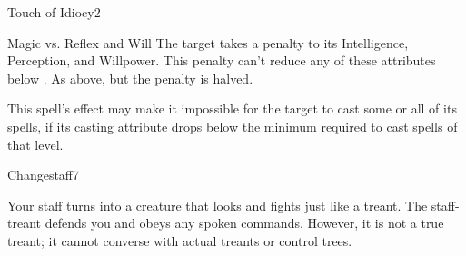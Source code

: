 \begin{spellfooter}
\begin{spellsection}{Touch of Idiocy}{2}
    \begin{spellheader}
    \end{spellheader}
    \begin{spellcontent}
        \begin{spelltargetinginfo}
        \end{spelltargetinginfo}
        \begin{spelleffects}
            \begin{spellattack}{Magic vs. Reflex and Will}
                \spellsuccess[Reflex] The target takes a  penalty to its Intelligence, Perception, and Willpower. This penalty can't reduce any of these attributes below .
                \spellfailure[Will] As above, but the penalty is halved.
            \end{spellattack}
            \spelldur \durshort
        \end{spelleffects}
    \end{spellcontent}
    \begin{spellfooter}
        \spellnotes This spell's effect may make it impossible for the target to cast some or all of its spells, if its casting attribute drops below the minimum required to cast spells of that level.
    \end{spellfooter}
\end{spellsection}

\begin{spellsection}{Changestaff}{7}
    \begin{spellheader}
    \end{spellheader}
    \begin{spellcontent}
        \begin{spelltargetinginfo}
        \end{spelltargetinginfo}
        \begin{spelleffects}
            \spelleffect Your staff turns into a creature that looks and fights just like a treant. The staff-treant defends you and obeys any spoken commands. However, it is not a true treant; it cannot converse with actual treants or control trees.


\end{spelleffects}
\end{spellcontent}
\end{spellsection}
\end{spellfooter}
